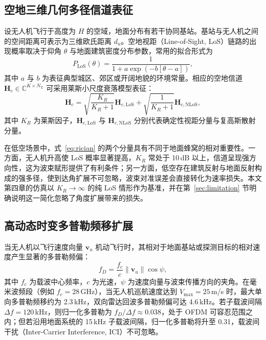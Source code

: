 \subsection{空地三维几何多径信道表征}
设无人机飞行于高度为 $H$ 的空域，地面分布有若干协同基站。基站与无人机之间的空间距离可表示为三维欧氏距离 $d_u$。空地视距（Line-of-Sight, LoS）链路的出现概率取决于仰角 $\theta$ 与地面建筑密度分布参数，常用的拟合形式为
\begin{equation}
  P_{\mathrm{LoS}}(\theta) = \frac{1}{1 + a \exp\left(-b[\theta - a]\right)},
  \label{eq:plos}
\end{equation}
其中 $a$ 与 $b$ 为表征典型城区、郊区或开阔地貌的环境常量。相应的空地信道 $\mathbf{H}_c \in \mathbb{C}^{K \times N_{\mathrm{T}}}$ 可采用莱斯小尺度衰落模型表征：
\begin{equation}
  \mathbf{H}_c = \sqrt{\frac{K_R}{K_R + 1}}\mathbf{H}_{c,\mathrm{LoS}} + \sqrt{\frac{1}{K_R + 1}}\mathbf{H}_{c,\mathrm{NLoS}},
  \label{eq:rician}
\end{equation}
其中 $K_R$ 为莱斯因子，$\mathbf{H}_{c,\mathrm{LoS}}$ 与 $\mathbf{H}_{c,\mathrm{NLoS}}$ 分别代表确定性视距分量与复高斯散射分量。

在低空场景中，式~\eqref{eq:rician} 的两个分量具有不同于地面蜂窝的相对重要性。一方面，无人机升高使 LoS 概率显著提高，$K_R$ 常处于 10\,dB 以上，信道呈现强方向性，这为波束赋形提供了有利条件；另一方面，低空存在建筑反射与地面反射构成的强多径，使到达角扩展不可忽略，波束对准误差会直接转化为速率损失。本文第四章的仿真以 $K_R\to\infty$ 的纯 LoS 情形作为基准，并在第~\ref{sec:limitation} 节明确说明这一简化忽略了角度扩展带来的损失。

\subsection{高动态时变多普勒频移扩展}
当无人机以飞行速度向量 $\mathbf{v}_u$ 机动飞行时，其相对于地面基站或探测目标的相对速度产生显著的多普勒频偏：
\begin{equation}
  f_{D} = \frac{f_c}{c} \|\mathbf{v}_u\| \cos\psi,
  \label{eq:doppler}
\end{equation}
其中 $f_c$ 为载波中心频率，$c$ 为光速，$\psi$ 为速度向量与波束传播方向的夹角。在毫米波频段（例如 $f_c = 28$\,GHz），当无人机巡航速度达到 $V_{\max} = 25$\,m/s 时，最大单向多普勒频移约为 2.3\,kHz，双向雷达回波多普勒频偏可达 4.6\,kHz。若子载波间隔 $\Delta f = 120$\,kHz，则归一化多普勒为 $f_D/\Delta f \approx 0.038$，处于 OFDM 可容忍范围之内；但若沿用地面系统的 15\,kHz 子载波间隔，归一化多普勒将升至 0.31，载波间干扰（Inter-Carrier Interference, ICI）不可忽略。

